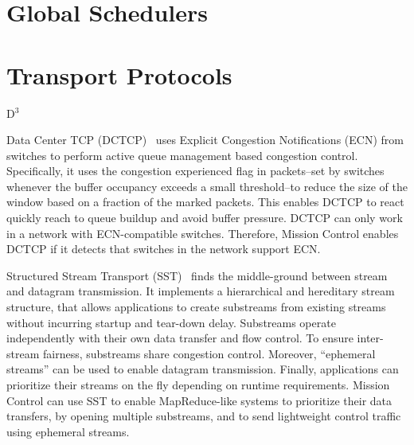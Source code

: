 \documentclass[a4paper,12pt,twoside,openright]{report}
\begin{document}
\section{Global Schedulers}

\section{Transport Protocols}
D$^3$~\cite{Wilson:2011:BNL}

Data Center TCP (DCTCP)~\cite{Alizadeh:2010:DCT} uses Explicit Congestion
Notifications (ECN) from switches to perform active queue management based
congestion control. Specifically, it uses the congestion experienced flag in
packets--set by switches whenever the buffer occupancy exceeds a small
threshold--to reduce the size of the window based on a fraction of the marked
packets. This enables DCTCP to react quickly reach to queue buildup and avoid
buffer pressure. DCTCP can only work in a network with ECN-compatible switches.
Therefore, Mission Control enables DCTCP if it detects that switches in the
network support ECN.

Structured Stream Transport (SST)~\cite{Ford:2007:SSN} finds the middle-ground
between stream and datagram transmission. It implements a hierarchical and
hereditary stream structure, that allows applications to create substreams from
existing streams without incurring startup and tear-down delay. Substreams
operate independently with their own data transfer and flow control. To ensure
inter-stream fairness, substreams share congestion control. Moreover,
``ephemeral streams'' can be used to enable datagram transmission. Finally,
applications can prioritize their streams on the fly depending on runtime
requirements. Mission Control can use SST to enable MapReduce-like systems to
prioritize their data transfers, by opening multiple substreams, and to send
lightweight control traffic using ephemeral streams.
\end{document}
